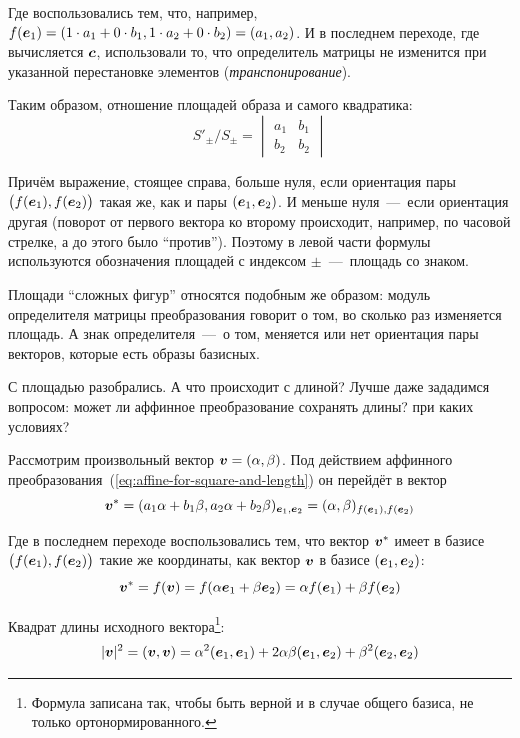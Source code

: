 \documentclass[a4paper,12pt]{article}
\begin{document}
  Где воспользовались тем, что, например, $f(\bds e_1) \hm= (1 \hm\cdot a_1 \hm+ 0 \hm\cdot b_1, 1 \hm\cdot a_2 \hm+ 0 \hm\cdot b_2) \hm= (a_1, a_2)$.
  И в последнем переходе, где вычисляется $\boldsymbol c$, использовали то, что определитель матрицы не изменится при указанной перестановке элементов (\emph{транспонирование}).
  
  Таким образом, отношение площадей образа и самого квадратика:
  \[
    S'_{\pm}/S_{\pm} = \begin{vmatrix}
      a_1 & b_1\\
      b_2 & b_2
    \end{vmatrix}
  \]
  
  Причём выражение, стоящее справа, больше нуля, если ориентация пары $\bigl(f(\boldsymbol e_1), f(\boldsymbol e_2)\bigr)$ такая же, как и пары $(\boldsymbol e_1, \boldsymbol e_2)$.
  И меньше нуля~---~если ориентация другая (поворот от первого вектора ко второму происходит, например, по часовой стрелке, а до этого было ``против'').
  Поэтому в левой части формулы используются обозначения площадей с индексом $\pm$~---~площадь со знаком.
  
  Площади ``сложных фигур'' относятся подобным же образом: модуль определителя матрицы преобразования говорит о том, во сколько раз изменяется площадь.
  А знак определителя~---~о том, меняется или нет ориентация пары векторов, которые есть образы базисных.
  
  
  \bigskip
  
  С площадью разобрались.
  А что происходит с длиной?
  Лучше даже зададимся вопросом: может ли аффинное преобразование сохранять длины? при каких условиях?
  
  Рассмотрим произвольный вектор $\bds v \hm= (\alpha, \beta)$.
  Под действием аффинного преобразования~(\ref{eq:affine-for-square-and-length}) он перейдёт в вектор
  \[
    \boldsymbol v^* = (a_1 \alpha + b_1 \beta, a_2 \alpha + b_2 \beta)_{\boldsymbol e_1, \boldsymbol e_2}
             = (\alpha, \beta)_{f(\boldsymbol e_1), f(\boldsymbol e_2)}
  \]
  
  Где в последнем переходе воспользовались тем, что вектор $\boldsymbol v^*$ имеет в базисе $\bigl(f(\boldsymbol e_1), f(\boldsymbol e_2)\bigr)$ такие же координаты, как вектор $\boldsymbol v$ в базисе $(\boldsymbol e_1, \boldsymbol e_2)$:
  \[
    \boldsymbol v^* = f(\boldsymbol v) = f(\alpha \boldsymbol e_1 + \beta \boldsymbol e_2) = \alpha f(\boldsymbol e_1) + \beta f(\boldsymbol e_2)
  \]
  
  Квадрат длины исходного вектора\footnote{Формула записана так, чтобы быть верной и в случае общего базиса, не только ортонормированного.}:
  \[
    |\boldsymbol v|^2 = (\boldsymbol v, \boldsymbol v) = \alpha^2 (\boldsymbol e_1, \boldsymbol e_1) + 2 \alpha \beta (\boldsymbol e_1, \boldsymbol e_2) + \beta^2 (\boldsymbol e_2, \boldsymbol e_2)
  \]
  
\end{document}
